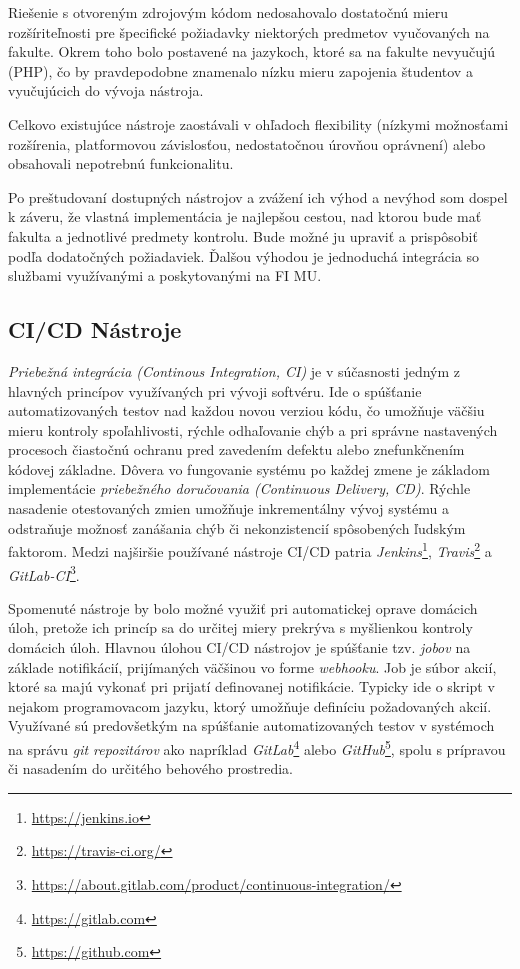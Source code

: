 \documentclass[
  digital, %
  oneside, %
  table,   %
  lof,     %
  lot,   %
]{fithesis3}
\begin{document}
Riešenie s otvoreným zdrojovým kódom nedosahovalo dostatočnú mieru rozšíriteľnosti pre špecifické požiadavky niektorých predmetov vyučovaných na fakulte. Okrem toho bolo postavené na jazykoch, ktoré sa na fakulte nevyučujú (PHP), čo by pravdepodobne znamenalo nízku mieru zapojenia študentov a vyučujúcich do vývoja nástroja.

Celkovo existujúce nástroje zaostávali v ohľadoch flexibility (nízkymi možnosťami rozšírenia, platformovou závislosťou, nedostatočnou úrovňou oprávnení) alebo obsahovali nepotrebnú funkcionalitu.

Po preštudovaní dostupných nástrojov a zvážení ich výhod a nevýhod som dospel k záveru, že vlastná implementácia je najlepšou cestou, nad ktorou bude mať fakulta a jednotlivé predmety kontrolu. Bude možné ju upraviť a prispôsobiť podľa dodatočných požiadaviek. Ďalšou výhodou je jednoduchá integrácia so službami využívanými a poskytovanými na FI MU.

\subsection{CI/CD Nástroje}

\emph{Priebežná integrácia (Continous Integration, CI)}\cite{mfowler-ci} je v súčasnosti jedným z hlavných princípov využívaných pri vývoji softvéru. Ide o spúšťanie automatizovaných testov nad každou novou verziou kódu, čo umožňuje väčšiu mieru kontroly spoľahlivosti, rýchle odhaľovanie chýb a pri správne nastavených procesoch čiastočnú ochranu pred zavedením defektu alebo znefunkčnením kódovej základne. Dôvera vo fungovanie systému po každej zmene je základom implementácie \emph{priebežného doručovania (Continuous Delivery, CD)}\cite{continous-delivery}. Rýchle nasadenie otestovaných zmien umožňuje inkrementálny vývoj systému a odstraňuje možnosť zanášania chýb či nekonzistencií spôsobených ľudským faktorom. Medzi najširšie používané nástroje CI/CD patria \textit{Jenkins}\footnote{\url{https://jenkins.io}}, \textit{Travis}\footnote{\url{https://travis-ci.org/}} a \textit{GitLab-CI}\footnote{\url{https://about.gitlab.com/product/continuous-integration/}}. 

Spomenuté nástroje by bolo možné využiť pri automatickej oprave domácich úloh, pretože ich princíp sa do určitej miery prekrýva s myšlienkou kontroly domácich úloh. Hlavnou úlohou CI/CD nástrojov je spúšťanie tzv. \emph{jobov} na základe notifikácií, prijímaných väčšinou vo forme \emph{webhooku}. Job je súbor akcií, ktoré sa majú vykonať pri prijatí definovanej notifikácie. Typicky ide o skript v nejakom programovacom jazyku, ktorý umožňuje definíciu požadovaných akcií. Využívané sú predovšetkým na spúšťanie automatizovaných testov v systémoch na správu \emph{git repozitárov} ako napríklad \emph{GitLab}\footnote{\url{https://gitlab.com}} alebo \emph{GitHub}\footnote{\url{https://github.com}}, spolu s prípravou či nasadením do určitého behového prostredia.  
\end{document}
